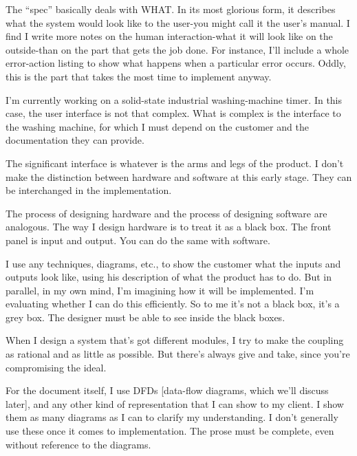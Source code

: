 \begin{tfquot}
\noindent The ``spec'' basically deals with WHAT. In its most glorious form, it
describes what the system would look like to the user-you might call it the
user's manual. I find I write more notes on the human interaction-what it
will look like on the outside-than on the part that gets the job done. For
instance, I'll include a whole error-action listing to show what happens when
a particular error occurs. Oddly, this is the part that takes the most time to
implement anyway.


I'm currently working on a solid-state industrial washing-machine timer. In
this case, the user interface is not that complex. What is complex is the
interface to the washing machine, for which I must depend on the customer
and the documentation they can provide.

The significant interface is whatever is the arms and legs of the product. I
don't make the distinction between hardware and software at this early
stage. They can be interchanged in the implementation.

The process of designing hardware and the process of designing software
are analogous. The way I design hardware is to treat it as a black box. The
front panel is input and output. You can do the same with software.

I use any techniques, diagrams, etc., to show the customer what the inputs
and outputs look like, using his description of what the product has to do.
But in parallel, in my own mind, I'm imagining how it will be implemented.
I'm evaluating whether I can do this efficiently. So to me it's not a black
box, it's a grey box. The designer must be able to see inside the black boxes.

When I design a system that's got different modules, I try to make the
coupling as rational and as little as possible. But there's always give and
take, since you're compromising the ideal.

For the document itself, I use DFDs {[}data-flow diagrams, which we'll
discuss later{]}, and any other kind of representation that I can show to my
client. I show them as many diagrams as I can to clarify my understanding.
I don't generally use these once it comes to implementation. The prose
must be complete, even without reference to the diagrams.
\end{tfquot}
\blackline{1ex}

